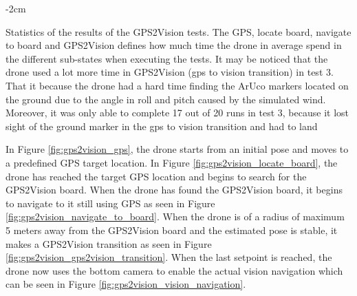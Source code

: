 \documentclass[../Head/report.tex]{subfiles}
\begin{document}
\begin{table}[H]
    \centering
    \addtolength{\leftskip} {-2cm}
    \addtolength{\rightskip}{-2cm}
        \caption{Statistics of the results of the GPS2Vision tests. The GPS, locate board, navigate to board and GPS2Vision defines how much time the drone in average spend in the different sub-states when executing the tests. It may be noticed that the drone used a lot more time in GPS2Vision (gps to vision transition) in test 3. That it because the drone had a hard time finding the ArUco markers located on the ground due to the angle in roll and pitch caused by the simulated wind. Moreover, it was only able to complete 17 out of 20 runs in test 3, because it lost sight of the ground marker in the gps to vision transition and had to land}
\label{tab:gps2vision_statistics}
\end{table}

In Figure \ref{fig:gps2vision_gps}, the drone starts from an initial pose and moves to a predefined GPS target location. In Figure \ref{fig:gps2vision_locate_board}, the drone has reached the target GPS location and begins to search for the GPS2Vision board. When the drone has found the GPS2Vision board, it begins to navigate to it still using GPS as seen in Figure \ref{fig:gps2vision_navigate_to_board}. When the drone is of a radius of maximum 5 meters away from the GPS2Vision board and the estimated pose is stable, it makes a GPS2Vision transition as seen in Figure \ref{fig:gps2vision_gps2vision_transition}. When the last setpoint is reached, the drone now uses the bottom camera to enable the actual vision navigation which can be seen in Figure \ref{fig:gps2vision_vision_navigation}. 
\end{document}
